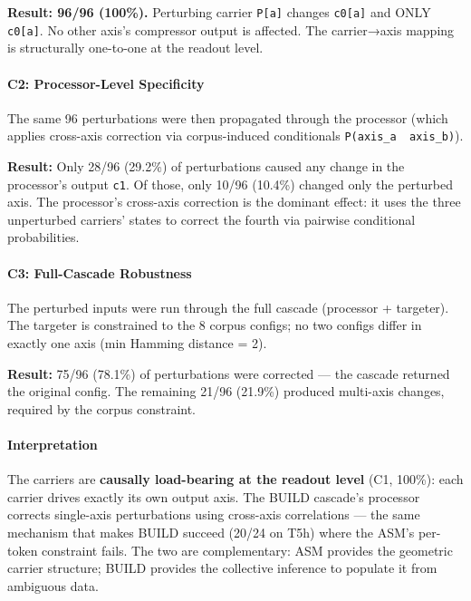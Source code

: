 \documentclass[
  twocolumn,
  10pt,
  a4paper]{article}
\begin{document}
\textbf{Result: 96/96 (100\%).} Perturbing carrier \texttt{P{[}a{]}}
changes \texttt{c0{[}a{]}} and ONLY \texttt{c0{[}a{]}}. No other axis's
compressor output is affected. The carrier→axis mapping is structurally
one-to-one at the readout level.

\hypertarget{c2-processor-level-specificity}{%
\paragraph{C2: Processor-Level
Specificity}\label{c2-processor-level-specificity}}

The same 96 perturbations were then propagated through the processor
(which applies cross-axis correction via corpus-induced conditionals
\texttt{P(axis\_a\ \textbar{}\ axis\_b)}).

\textbf{Result:} Only 28/96 (29.2\%) of perturbations caused any change
in the processor's output \texttt{c1}. Of those, only 10/96 (10.4\%)
changed only the perturbed axis. The processor's cross-axis correction
is the dominant effect: it uses the three unperturbed carriers' states
to correct the fourth via pairwise conditional probabilities.

\hypertarget{c3-full-cascade-robustness}{%
\paragraph{C3: Full-Cascade
Robustness}\label{c3-full-cascade-robustness}}

The perturbed inputs were run through the full cascade (processor +
targeter). The targeter is constrained to the 8 corpus configs; no two
configs differ in exactly one axis (min Hamming distance = 2).

\textbf{Result:} 75/96 (78.1\%) of perturbations were corrected --- the
cascade returned the original config. The remaining 21/96 (21.9\%)
produced multi-axis changes, required by the corpus constraint.

\hypertarget{interpretation}{%
\paragraph{Interpretation}\label{interpretation}}

The carriers are \textbf{causally load-bearing at the readout level}
(C1, 100\%): each carrier drives exactly its own output axis. The BUILD
cascade's processor corrects single-axis perturbations using cross-axis
correlations --- the same mechanism that makes BUILD succeed (20/24 on
T5h) where the ASM's per-token constraint fails. The two are
complementary: ASM provides the geometric carrier structure; BUILD
provides the collective inference to populate it from ambiguous data.
\end{document}
